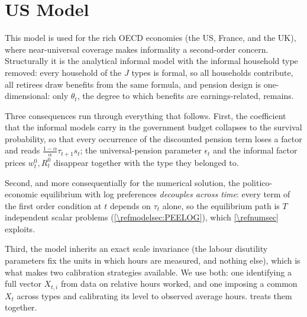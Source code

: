 \edef\refsec{\refmodelsec}
\edef\refeq{\refmodeleq}

\section{US Model}\label{\refsec}
This model is used for the rich OECD economies (the US, France, and the UK), where near-universal coverage makes informality a second-order concern. Structurally it is the analytical informal model with the informal household type removed: every household of the $J$ types is formal, so all households contribute, all retirees draw benefits from the same formula, and pension design is one-dimensional: only $\theta_t$, the degree to which benefits are earnings-related, remains.


Three consequences run through everything that follows. First, the coefficient that the informal models carry in the government budget collapses to the survival probability, so that every occurrence of the discounted pension term loses a factor and reads $\frac{1-\alpha}{\alpha}\tau_{t+1}s_t$; the universal-pension parameter $\epsilon_t$ and the informal factor prices $w_t^0, R_t^0$ disappear together with the type they belonged to.

Second, and more consequentially for the numerical solution, the politico-economic equilibrium with log preferences \emph{decouples across time}: every term of the first order condition at $t$ depends on $\tau_t$ alone, so the equilibrium path is $T$ independent scalar problems (\cref{\refsec:PEELOG}), which \cref{\refnumsec} exploits.

Third, the model inherits an exact scale invariance (the labour disutility parameters fix the units in which hours are measured, and nothing else), which is what makes two calibration strategies available. We use both: one identifying a full vector $X_{t,i}$ from data on relative hours worked, and one imposing a common $X_t$ across types and calibrating its level to observed average hours. \Cref{\refsec:calibration} treats them together.









